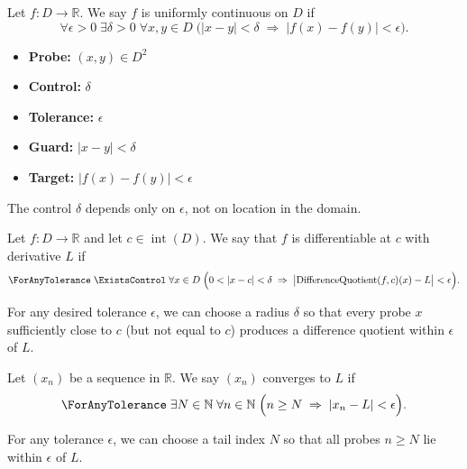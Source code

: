 \begin{definition}
Let $f : D \to \mathbb{R}$. We say $f$ is uniformly continuous on $D$ if
\[
\forall \epsilon > 0\;\exists \delta > 0\;\forall x,y \in D\;
\Big(
|x - y| < \delta
\;\Rightarrow\;
|f(x) - f(y)| < \epsilon
\Big).
\]

\begin{itemize}
    \item \textbf{Probe:} $(x,y) \in D^2$
    \item \textbf{Control:} $\delta$
    \item \textbf{Tolerance:} $\epsilon$
    \item \textbf{Guard:} $|x - y| < \delta$
    \item \textbf{Target:} $|f(x) - f(y)| < \epsilon$
\end{itemize}

The control $\delta$ depends only on $\epsilon$, not on location in the domain.
\end{definition}


\begin{definition}
Let $f : D \to \mathbb{R}$ and let $c \in \operatorname{int}(D)$. We say that $f$ is differentiable at $c$ with derivative $L$ if
\[
\ForAnyTolerance\;\ExistsControl\;\forall x \in D\;
\Big(
0 < |x - c| < \delta
\;\Rightarrow\;
\big|
\mathrm{DifferenceQuotient}(f,c)(x) - L
\big| < \epsilon
\Big).
\]

\begin{remark*}[Interpretation]
For any desired tolerance $\epsilon$, we can choose a radius $\delta$ so that every probe $x$ sufficiently close to $c$ (but not equal to $c$) produces a difference quotient within $\epsilon$ of $L$.
\end{remark*}
\end{definition}


\begin{definition}
Let $(x_n)$ be a sequence in $\mathbb{R}$. We say $(x_n)$ converges to $L$ if
\[
\ForAnyTolerance\;\exists N \in \mathbb{N}\;\forall n \in \mathbb{N}\;
\Big(
n \geq N
\;\Rightarrow\;
|x_n - L| < \epsilon
\Big).
\]

\begin{remark*}[Interpretation]
For any tolerance $\epsilon$, we can choose a tail index $N$ so that all probes $n \geq N$ lie within $\epsilon$ of $L$.
\end{remark*}
\end{definition}




